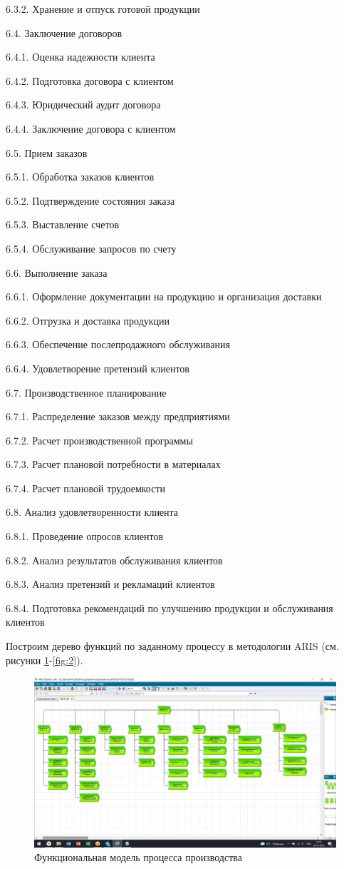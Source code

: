 \documentclass[a4paper,14pt]{extarticle}
\begin{document}
6.3.2. Хранение и отпуск готовой продукции

6.4. Заключение договоров

6.4.1. Оценка надежности клиента

6.4.2. Подготовка договора с клиентом


6.4.3. Юридический аудит договора

6.4.4. Заключение договора с клиентом


6.5. Прием заказов

6.5.1. Обработка заказов клиентов

6.5.2. Подтверждение состояния заказа

6.5.3. Выставление счетов

6.5.4. Обслуживание запросов по счету

6.6. Выполнение заказа

6.6.1. Оформление документации на продукцию и организация доставки

6.6.2. Отгрузка и доставка продукции

6.6.3. Обеспечение послепродажного обслуживания

6.6.4. Удовлетворение претензий клиентов

6.7. Производственное планирование

6.7.1. Распределение заказов между предприятиями

6.7.2. Расчет производственной программы

6.7.3. Расчет плановой потребности в материалах

6.7.4. Расчет плановой трудоемкости

6.8. Анализ удовлетворенности клиента

6.8.1. Проведение опросов клиентов

6.8.2. Анализ результатов обслуживания клиентов

6.8.3. Анализ претензий и рекламаций клиентов

6.8.4. Подготовка рекомендаций по улучшению продукции и обслуживания
клиентов

Построим дерево функций по заданному процессу в методологии ARIS (см. рисунки \ref{fig:top}-\ref{fig:2}).

\begin{figure}[htpb]
	\centering
	\includegraphics[width=1\linewidth]{images/pr-19/top}
	\caption{Функциональная модель процесса производства}
	\label{fig:top}
\end{figure}
\end{document}
